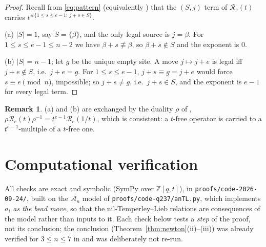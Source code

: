 \documentclass[11pt]{article}
\theoremstyle{plain}
\theoremstyle{definition}
\newtheorem{remark}[theorem]{Remark}
\newcommand{\A}{\mathscr{A}}
\newcommand{\ZZ}{\mathbb{Z}}
\begin{document}
\begin{proof}
Recall from \eqref{eq:pattern} (equivalently \cite[\texttt{eq:ribbondef}]{Clio201}) that the
$(S,j)$ term of $\mathcal R_e(t)$ carries $t^{\#\{1\le s\le e-1:\ j+s\in S\}}$.

(a) $|S|=1$, say $S=\{\beta\}$, and the only legal source is $j=\beta$.  For
$1\le s\le e-1\le n-2$ we have $\beta+s\not\equiv\beta$, so $\beta+s\notin S$
and the exponent is $0$.

(b) $|S|=n-1$; let $g$ be the unique empty site.  A move $j\mapsto j+e$ is legal
iff $j+e\notin S$, i.e.\ $j+e=g$.  For $1\le s\le e-1$, $j+s\equiv g=j+e$ would
force $s\equiv e\pmod n$, impossible; so $j+s\ne g$, i.e.\ $j+s\in S$, and the
exponent is $e-1$ for every legal term.
\end{proof}

\begin{remark}
(a) and (b) are exchanged by the duality $\rho$ of
\cite[\texttt{cor:duality}]{Clio201}, $\rho\mathcal R_e(t)\rho^{-1}=t^{e-1}\mathcal R_e(1/t)$,
which is consistent: a $t$-free operator is carried to a $t^{e-1}$-multiple of a
$t$-free one.
\end{remark}

\section{Computational verification}\label{sec:verif}

All checks are exact and symbolic (SymPy over $\ZZ[q,t]$), in
\texttt{proofs/code-2026-09-24/}, built on the $\A_n$ model of
\texttt{proofs/code-q237/anTL.py}, which implements $a_i$ \emph{as the bead
move}, so that the nil-Temperley--Lieb relations are consequences of the model rather
than inputs to it.  Each check below tests a \emph{step} of the proof, not its
conclusion; the conclusion (Theorem~\ref{thm:newton}(ii)--(iii)) was already
verified for $3\le n\le7$ in \cite{Clio201} and was deliberately not re-run.
\end{document}

